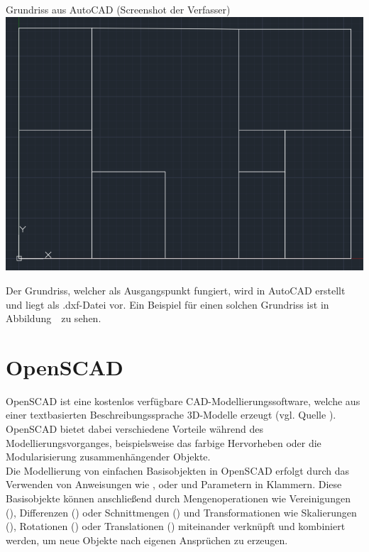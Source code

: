 \begin{Bild}{Grundriss aus AutoCAD (Screenshot der Verfasser)}
	\includegraphics[width=\textwidth]{Bilder/Grundriss}
\end{Bild}

Der Grundriss, welcher als Ausgangspunkt fungiert, wird in AutoCAD erstellt und liegt als .dxf-Datei vor.
Ein Beispiel für einen solchen Grundriss ist in Abbildung~\thebildnr\ zu sehen.

\section{OpenSCAD}
OpenSCAD ist eine kostenlos verfügbare CAD-Modellierungssoftware, welche aus einer textbasierten Beschreibungssprache 3D-Modelle erzeugt (vgl. Quelle \cite{OpenScad}).
OpenSCAD bietet dabei verschiedene Vorteile während des Modellierungsvorganges, beispielsweise das farbige Hervorheben oder die Modularisierung zusammenhängender Objekte. \\

Die Modellierung von einfachen Basisobjekten in OpenSCAD erfolgt durch das Verwenden von Anweisungen wie ,  oder  und Parametern in Klammern.
Diese Basisobjekte können anschließend durch Mengenoperationen wie Vereinigungen (), Differenzen () oder Schnittmengen () und Transformationen wie Skalierungen (), Rotationen () oder Translationen () miteinander verknüpft und kombiniert werden, um neue Objekte nach eigenen Ansprüchen zu erzeugen.

